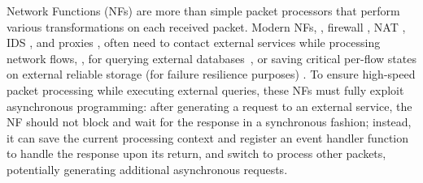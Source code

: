 Network Functions (NFs) are more than simple packet processors that perform various transformations on each received packet. Modern NFs, \eg, firewall \cite{201545}, NAT \cite{201545}, IDS \cite{bro}, and proxies \cite{haproxy, project-clearwater}, often need to contact external services while processing network flows, \eg, for
querying external databases~\cite{telephone-number-mapping, bro-scripting-tutorial}, or saving critical per-flow states on external reliable storage (for failure resilience purposes) \cite{201545}. To ensure high-speed packet processing while executing external queries, these NFs must fully exploit asynchronous programming: after generating a request to an external service, the NF should not block and wait for the response in a synchronous fashion; instead, it can save the current processing context and register an event handler function to handle the response upon its return, and switch to process other packets, potentially generating additional asynchronous requests.




